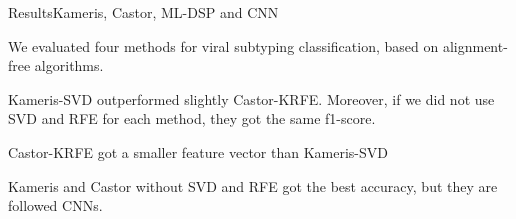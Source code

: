 \documentclass[10pt]{beamer}
\newcommand{\1}{
        	\setbeamertemplate{background}{
        		\texttt{[image: img/1]}
        		\tikz[overlay] \fill[fill opacity=0.75,fill=white] (0,0) rectangle (-\paperwidth,\paperheight);
        	}
}
\begin{document}
\begin{frame}{Results}{Kameris, Castor, ML-DSP and CNN}
	
	\begin{block}{}
		We evaluated four methods for viral subtyping classification, based on alignment-free algorithms.
	\end{block}

	\begin{block}{}
		Kameris-SVD outperformed slightly Castor-KRFE. Moreover, if we did not use SVD and RFE for each method, they got the same f1-score. 
	\end{block}

	\begin{block}{}
		 Castor-KRFE got a smaller feature vector than Kameris-SVD
	\end{block}

	\begin{block}{}
		Kameris and Castor without SVD and RFE got the best accuracy, but they are followed CNNs.
	\end{block}
	
\end{frame}



\end{document}
